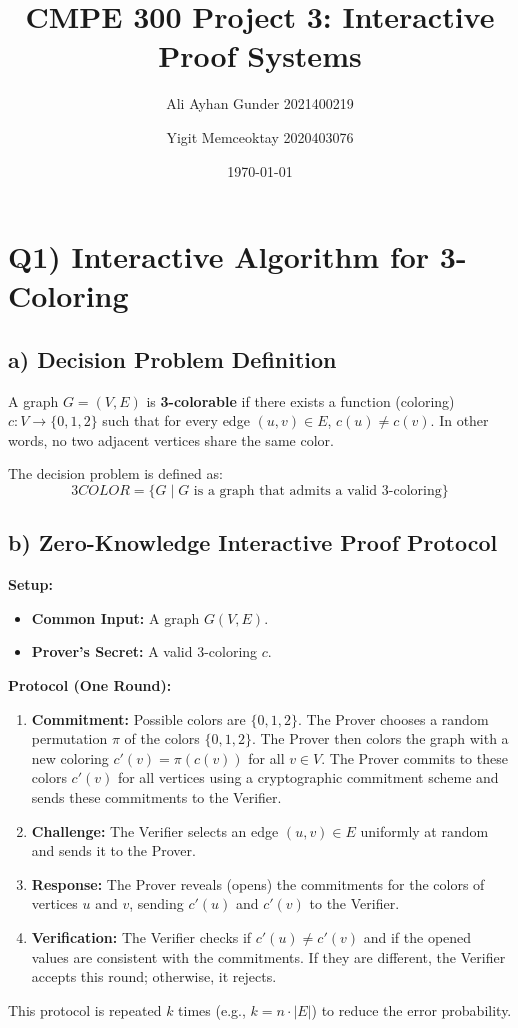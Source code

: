 \documentclass[11pt]{article}
\title{CMPE 300 Project 3: Interactive Proof Systems}
\author{Ali Ayhan Gunder 2021400219 \and Yigit Memceoktay 2020403076}
\date{\today}
\begin{document}
\maketitle

\section*{Q1) Interactive Algorithm for 3-Coloring}

\subsection*{a) Decision Problem Definition}
A graph $G=(V, E)$ is \textbf{3-colorable} if there exists a function (coloring) $c: V \to \{0, 1, 2\}$ such that for every edge $(u, v) \in E$, $c(u) \neq c(v)$. In other words, no two adjacent vertices share the same color.

The decision problem is defined as:
\[
3COLOR = \{ G \mid G \text{ is a graph that admits a valid 3-coloring} \}
\]

\subsection*{b) Zero-Knowledge Interactive Proof Protocol}
\textbf{Setup:}
\begin{itemize}
    \item \textbf{Common Input:} A graph $G(V, E)$.
    \item \textbf{Prover's Secret:} A valid 3-coloring $c$.
\end{itemize}

\textbf{Protocol (One Round):}
\begin{enumerate}
    \item \textbf{Commitment:} Possible colors are $\{0, 1, 2\}$. The Prover chooses a random permutation $\pi$ of the colors $\{0, 1, 2\}$. The Prover then colors the graph with a new coloring $c'(v) = \pi(c(v))$ for all $v \in V$. The Prover commits to these colors $c'(v)$ for all vertices using a cryptographic commitment scheme and sends these commitments to the Verifier.
    \item \textbf{Challenge:} The Verifier selects an edge $(u, v) \in E$ uniformly at random and sends it to the Prover.
    \item \textbf{Response:} The Prover reveals (opens) the commitments for the colors of vertices $u$ and $v$, sending $c'(u)$ and $c'(v)$ to the Verifier.
    \item \textbf{Verification:} The Verifier checks if $c'(u) \neq c'(v)$ and if the opened values are consistent with the commitments. If they are different, the Verifier accepts this round; otherwise, it rejects.
\end{enumerate}
This protocol is repeated $k$ times (e.g., $k=n \cdot |E|$) to reduce the error probability.
\end{document}
